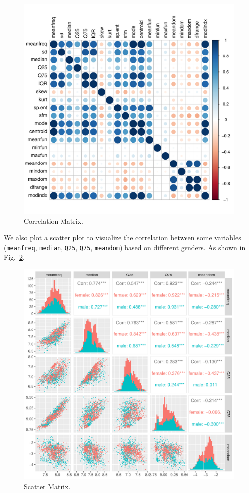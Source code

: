\documentclass{article}
\begin{document}
	\begin{figure}
		\centering
		\includegraphics[width=\textwidth]{graphs/correlation_matrix.pdf}
		\caption{Correlation Matrix.}
		\label{correlation_matrix}
	\end{figure}
	
	We also plot a scatter plot to visualize the correlation between some variables (\texttt{meanfreq}, \texttt{median}, \texttt{Q25}, \texttt{Q75}, \texttt{meandom}) based on different genders. As shown in Fig.~\ref{scatter_matrix}.
	\begin{figure}
		\centering
		\includegraphics[width=\textwidth]{graphs/scatter_matrix.pdf}
		\caption{Scatter Matrix.}
		\label{scatter_matrix}
	\end{figure}
	
\end{document}
